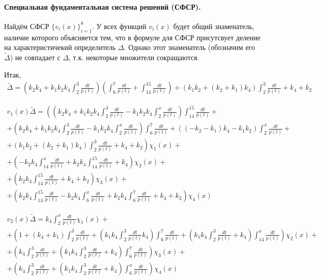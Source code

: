 \documentclass[a4paper,12pt]{article} %
\begin{document}
\paragraph{Специальная фундаментальная система решений (СФСР).}
Найдём СФСР $\{v_i(x)\}_{i=1}^{8}$.
У всех функций $v_i(x)$ будет общий знаменатель,
наличие которого объясняется тем,
что в формуле для СФСР присутсвует деление на характеристичекий определитель $\Delta$.
Однако этот знаменатель (обозначим его $\tilde{\Delta}$)
не совпадает с $\Delta$,
т.к. некоторые множители сокращаются.


Итак,
\begin{multline}
	\tilde{\Delta} =
	\left( k_2 k_4+k_1 k_2 k_4 \int_{2}^{3}\frac{dt}{p(t)}\right)
	\left( \int_{6}^{7}\frac{dt}{p(t)}+ \int_{14}^{15}\frac{dt}{p(t)} \right)+
	\left( k_1 k_2+\left( k_2+k_1\right)  k_4\right)  \int_{2}^{3}\frac{dt}{p(t)}+k_4+k_2
\end{multline}

\begin{multline}
	{v_1(x)}{\tilde{\Delta}}=
	\left(
		\left( k_2 k_4+k_1 k_2 k_4 \int_{2}^{3}\frac{dt}{p(t)}-k_1 k_2 k_4 \int_{2}^{x}\frac{dt}{p(t)}\right)  \int_{14}^{15}\frac{dt}{p(t)}
		\right. +\\+ \left.
		\left( k_2 k_4+k_1 k_2 k_4 \int_{2}^{3}\frac{dt}{p(t)}-k_1 k_2 k_4 \int_{2}^{x}\frac{dt}{p(t)}\right)  \int_{6}^{7}\frac{dt}{p(t)}+\left( \left( -k_2-k_1\right)  k_4-k_1 k_2\right)  \int_{2}^{x}\frac{dt}{p(t)}
		\right. +\\+ \left.
		\left( k_1 k_2+\left( k_2+k_1\right)  k_4\right)  \int_{2}^{3}\frac{dt}{p(t)}+k_4+k_2
	\right)\chi_1(x)
	+\\+
	\left(
		-k_2 k_4 \int_{14}^{x}\frac{dt}{p(t)}+k_2 k_4 \int_{14}^{15}\frac{dt}{p(t)}+k_4
	\right)\chi_2(x)
	+\\+
	\left(
		k_2 k_4 \int_{14}^{15}\frac{dt}{p(t)}+k_4+k_2
	\right)\chi_3(x)
	+\\+
	\left(
		k_2 k_4 \int_{14}^{15}\frac{dt}{p(t)}-k_2 k_4 \int_{6}^{x}\frac{dt}{p(t)}+k_2 k_4 \int_{6}^{7}\frac{dt}{p(t)}+k_4+k_2
	\right)\chi_4(x)
\end{multline}

\begin{multline}
	{v_2(x)}{\tilde{\Delta}}=
	k_4 \int_{2}^{x}\frac{dt}{p(t)} \chi_1(x)
	+\\+
	\left( 1+\left( k_4+k_1\right)  \int_{2}^{3}\frac{dt}{p(t)}+\left( k_1 k_4 \int_{2}^{3}\frac{dt}{p(t)}
	k_4\right)  \int_{6}^{7}\frac{dt}{p(t)}+\left( k_1 k_4 \int_{2}^{3}\frac{dt}{p(t)}+k_4\right)  \int_{14}^{x}\frac{dt}{p(t)}\right)  \chi_2(x)
	+\\+
	\left( k_4 \int_{2}^{3}\frac{dt}{p(t)}+\left( k_1 k_4 \int_{2}^{3}\frac{dt}{p(t)}+k_4\right)  \int_{6}^{7}\frac{dt}{p(t)}\right)  \chi_3(x)
	+\\+
	\left( k_4 \int_{2}^{3}\frac{dt}{p(t)}+\left( k_1 k_4 \int_{2}^{3}\frac{dt}{p(t)}+k_4\right)  \int_{6}^{x}\frac{dt}{p(t)}\right)  \chi_4(x)
\end{multline}
\end{document}
